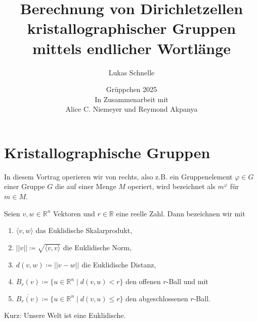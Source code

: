 \documentclass{beamer}
\title{Berechnung von Dirichletzellen kristallographischer Gruppen mittels endlicher Wortlänge }
\author{Lukas Schnelle}
\date{Grüppchen 2025 \\ In Zusammenarbeit mit \\Alice C. Niemeyer und Reymond Akpanya}
\theoremstyle{plain}
\newcommand\R{\mathbb R}
\renewcommand{\phi}{\varphi}
\begin{document}
\frame[plain]{\titlepage}

\section{Kristallographische Gruppen}
\begin{frame}
    In diesem Vortrag operieren wir von rechts, also z.B. ein Gruppenelement $\phi \in G$ einer Gruppe $G$ die auf einer Menge $M$ operiert, wird bezeichnet als $m^\phi$ für $m \in M$.
    \pause
    \begin{notation}
        Seien $v, w \in \R^n$ Vektoren und $r \in \R$ eine reelle Zahl. \pause 
        Dann bezeichnen wir mit 
        \begin{enumerate}[label=(\roman*)]
            \item $\langle v, w \rangle$ das Euklidische Skalarprodukt,\pause
            \item $||v|| \coloneqq \sqrt{\langle v, v \rangle}$ die Euklidische Norm,\pause
            \item $d(v, w) \coloneqq ||v - w ||$ die Euklidische Distanz,\pause
            \item $B_r(v) \coloneqq \{ u \in \R^n \mid d(v, u) < r \}$ den offenen $r$-Ball und mit \pause
            \item $\overline{B_r(v)} \coloneqq \{ u \in \R^n \mid d(v, u) \leq r \}$ den abgeschlossenen $r$-Ball. 
        \end{enumerate}  
    \end{notation}
    \pause
    Kurz: Unsere Welt ist eine Euklidische.
\end{frame}
\end{document}
